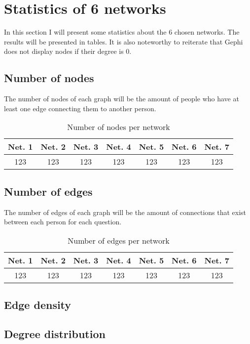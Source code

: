 \section{Statistics of 6 networks}
In this section I will present some statistics about the 6 chosen networks. The results will be presented in tables. It is also noteworthy to reiterate that Gephi does not display nodes if their degree is 0.

\subsection{Number of nodes}
The number of nodes of each graph will be the amount of people who have at least one edge connecting them to another person.

\begin{table}[h]
    \centering
    \begin{tabular}{|c|c|c|c|c|c|c|}
        \hline
        Net. 1 & Net. 2 & Net. 3 & Net. 4 & Net. 5 & Net. 6 & Net. 7 \\
        \hline
        123 & 123 & 123 & 123 & 123 & 123 & 123 \\
        \hline
    \end{tabular}
    \caption{Number of nodes per network}
    \label{table:1}
\end{table}

\subsection{Number of edges}
The number of edges of each graph will be the amount of connections that exist between each person for each question.

\begin{table}[h]
    \centering
    \begin{tabular}{|c|c|c|c|c|c|c|}
        \hline
        Net. 1 & Net. 2 & Net. 3 & Net. 4 & Net. 5 & Net. 6 & Net. 7 \\
        \hline
        123 & 123 & 123 & 123 & 123 & 123 & 123 \\
        \hline
    \end{tabular}
    \caption{Number of edges per network}
    \label{table:2}
\end{table}

\subsection{Edge density}

\subsection{Degree distribution}

